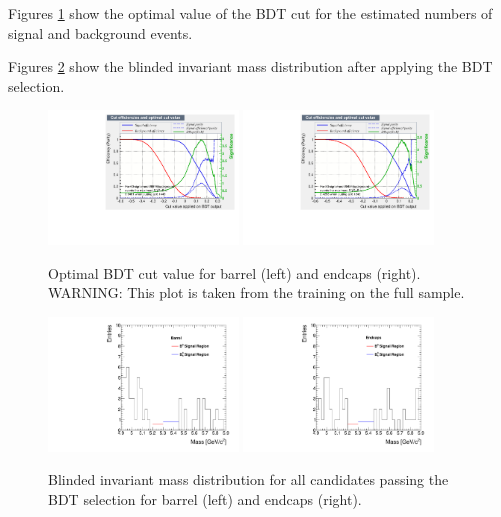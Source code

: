 Figures \ref{fig:massOptimalCut} show the optimal value of the BDT cut for the estimated numbers of signal and background
events.

Figures \ref{fig:massPlotBlinded} show the blinded invariant mass distribution after applying the BDT selection.

\begin{figure}
  \centering
  \includegraphics[width=0.45\textwidth]{Figures/mvaeffs_BDT_barrel.pdf}
  \includegraphics[width=0.45\textwidth]{Figures/mvaeffs_BDT_endcaps.pdf}
  \caption{Optimal BDT cut value for barrel (left) and endcaps (right). WARNING: This plot is taken from the training on the full sample.}
  \label{fig:massOptimalCut}
\end{figure}

\begin{figure}
  \centering
  \includegraphics[width=0.45\textwidth]{Figures/BarrelMassPlot.pdf}
  \includegraphics[width=0.45\textwidth]{Figures/EndcapsMassPlot.pdf}
  \caption{Blinded invariant mass distribution for all candidates passing the BDT selection for barrel (left) and endcaps (right).}
  \label{fig:massPlotBlinded}
\end{figure}

